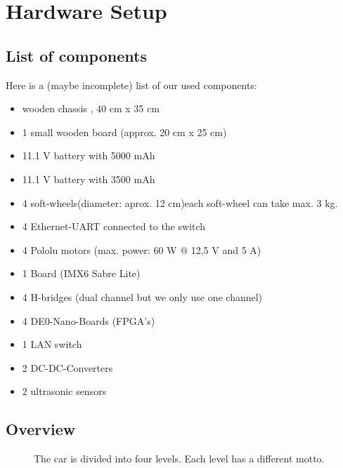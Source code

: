 \section{Hardware Setup}

\subsection{List of components}
Here is a (maybe incomplete) list of our used components:
\begin{itemize}
	\item wooden chassis , 40 cm x 35 cm
	\item 1 small wooden board (approx. 20 cm x 25 cm)
	\item 11.1 V battery with 5000 mAh
	\item 11.1 V battery with 3500 mAh
	\item 4 soft-wheels(diameter: aprox. 12 cm)each soft-wheel can take max. 3 kg. 
	\item 4 Ethernet-UART  connected to the switch
	\item 4 Pololu motors (max. power: 60 W @ 12,5 V and 5 A)
	\item 1 Board (IMX6 Sabre Lite)
	\item 4 H-bridges (dual channel but we only use one channel)
	\item 4 DE0-Nano-Boards (FPGA’s)
	\item 1 LAN switch
	\item 2 DC-DC-Converters
	\item 2 ultrasonic sensors
\end{itemize}

\subsection{Overview}

\begin{figure}[h]
	\caption{The car is divided into four levels. Each level has a different motto.}
\end{figure}

